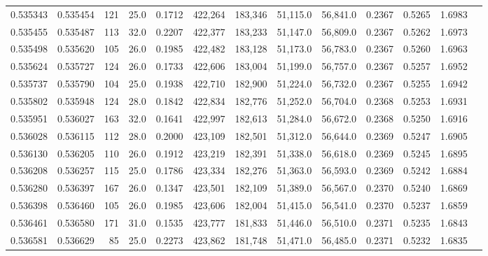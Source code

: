 \begin{tabular}{rrrrrrrrrrrrr}
0.535343 & 0.535454 &   121 & 25.0 &                                     0.1712 & 422,264 & 183,346 &  51,115.0 &  56,841.0 & 0.2367 & 0.5265 & 1.6983 \\
0.535455 & 0.535487 &   113 & 32.0 &                                     0.2207 & 422,377 & 183,233 &  51,147.0 &  56,809.0 & 0.2367 & 0.5262 & 1.6973 \\
0.535498 & 0.535620 &   105 & 26.0 &                                     0.1985 & 422,482 & 183,128 &  51,173.0 &  56,783.0 & 0.2367 & 0.5260 & 1.6963 \\
0.535624 & 0.535727 &   124 & 26.0 &                                     0.1733 & 422,606 & 183,004 &  51,199.0 &  56,757.0 & 0.2367 & 0.5257 & 1.6952 \\
0.535737 & 0.535790 &   104 & 25.0 &                                     0.1938 & 422,710 & 182,900 &  51,224.0 &  56,732.0 & 0.2367 & 0.5255 & 1.6942 \\
0.535802 & 0.535948 &   124 & 28.0 &                                     0.1842 & 422,834 & 182,776 &  51,252.0 &  56,704.0 & 0.2368 & 0.5253 & 1.6931 \\
0.535951 & 0.536027 &   163 & 32.0 &                                     0.1641 & 422,997 & 182,613 &  51,284.0 &  56,672.0 & 0.2368 & 0.5250 & 1.6916 \\
0.536028 & 0.536115 &   112 & 28.0 &                                     0.2000 & 423,109 & 182,501 &  51,312.0 &  56,644.0 & 0.2369 & 0.5247 & 1.6905 \\
0.536130 & 0.536205 &   110 & 26.0 &                                     0.1912 & 423,219 & 182,391 &  51,338.0 &  56,618.0 & 0.2369 & 0.5245 & 1.6895 \\
0.536208 & 0.536257 &   115 & 25.0 &                                     0.1786 & 423,334 & 182,276 &  51,363.0 &  56,593.0 & 0.2369 & 0.5242 & 1.6884 \\
0.536280 & 0.536397 &   167 & 26.0 &                                     0.1347 & 423,501 & 182,109 &  51,389.0 &  56,567.0 & 0.2370 & 0.5240 & 1.6869 \\
0.536398 & 0.536460 &   105 & 26.0 &                                     0.1985 & 423,606 & 182,004 &  51,415.0 &  56,541.0 & 0.2370 & 0.5237 & 1.6859 \\
0.536461 & 0.536580 &   171 & 31.0 &                                     0.1535 & 423,777 & 181,833 &  51,446.0 &  56,510.0 & 0.2371 & 0.5235 & 1.6843 \\
0.536581 & 0.536629 &    85 & 25.0 &                                     0.2273 & 423,862 & 181,748 &  51,471.0 &  56,485.0 & 0.2371 & 0.5232 & 1.6835 \\

\end{tabular}
